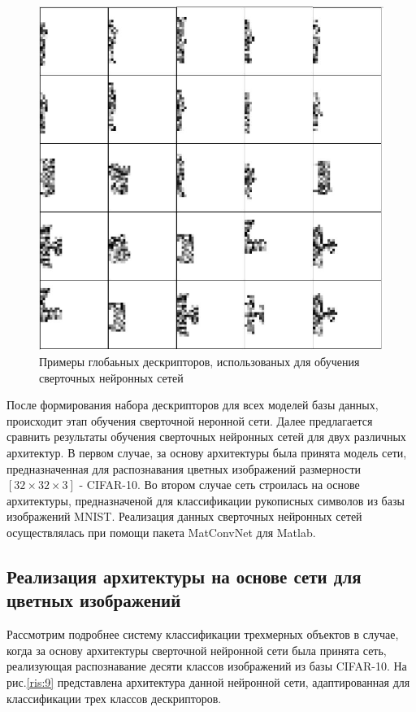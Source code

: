 \documentclass[14pt]{article}
\numberwithin{figure}{section}
\numberwithin{equation}{section}
\begin{document}
 \begin{figure}[h]
 	\begin{center}
 		\includegraphics[scale=0.75] {8.JPG}
 		\caption{Примеры глобаьных дескрипторов, использованых для обучения сверточных нейронных сетей}
 		\label{ris:8}
 	\end{center}
 \end{figure}

 После формирования набора дескрипторов для всех моделей базы данных, происходит этап обучения сверточной неронной сети. Далее предлагается сравнить результаты обучения сверточных нейронных сетей для двух различных архитектур. В первом случае, за основу архитектуры была принята модель сети, предназначенная для распознавания цветных изображений размерности $[32 \times 32 \times 3]$ - CIFAR-10. Во втором случае сеть строилась на основе архитектуры, предназначеной для классификации рукописных символов из базы изображений MNIST. Реализация данных сверточных нейронных сетей осуществлялась при помощи пакета MatConvNet для Matlab.

 \subsection{Реализация архитектуры на основе сети для цветных изображений}\label{ssec4.2}

Рассмотрим подробнее систему классификации трехмерных объектов в случае, когда за основу архитектуры сверточной нейронной сети была принята сеть, реализующая распознавание десяти классов изображений из базы CIFAR-10. На рис.\ref{ris:9} представлена архитектура данной нейронной сети, адаптированная для классификации трех классов дескрипторов.
\end{document}
